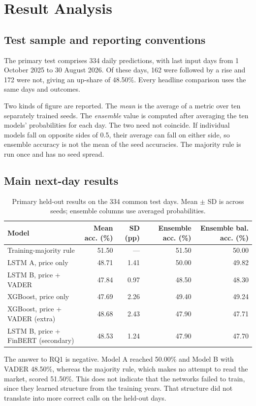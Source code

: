 \section{Result Analysis}
\label{ch:results}
\subsection{Test sample and reporting conventions}
The primary test comprises 334 daily predictions, with last input days from 1 October 2025 to 30 August 2026. Of these days, 162 were followed by a rise and 172 were not, giving an up-share of 48.50\%. Every headline comparison uses the same days and outcomes.

Two kinds of figure are reported. The \emph{mean} is the average of a metric over ten separately trained seeds. The \emph{ensemble} value is computed after averaging the ten models' probabilities for each day. The two need not coincide. If individual models fall on opposite sides of 0.5, their average can fall on either side, so ensemble accuracy is not the mean of the seed accuracies. The majority rule is run once and has no seed spread.

\subsection{Main next-day results}
\begin{table}[htbp]\centering\small
\caption{Primary held-out results on the 334 common test days. Mean $\pm$ SD is across seeds; ensemble columns use averaged probabilities.}\label{tab:mainresults}
\begin{tabularx}{\textwidth}{Xrrrr}
\toprule
Model & Mean acc. (\%) & SD (pp) & Ensemble acc. (\%) & Ensemble bal. acc. (\%)\\\midrule
Training-majority rule & 51.50 & --- & 51.50 & 50.00\\
LSTM A, price only & 48.71 & 1.41 & 50.00 & 49.82\\
LSTM B, price + VADER & 47.84 & 0.97 & 48.50 & 48.30\\
XGBoost, price only & 47.69 & 2.26 & 49.40 & 49.24\\
XGBoost, price + VADER (extra) & 48.68 & 2.43 & 47.90 & 47.71\\
LSTM B, price + FinBERT (secondary) & 48.53 & 1.24 & 47.90 & 47.70\\
\bottomrule
\end{tabularx}
\end{table}

The answer to RQ1 is negative. Model A reached 50.00\% and Model B with VADER 48.50\%, whereas the majority rule, which makes no attempt to read the market, scored 51.50\%. This does not indicate that the networks failed to train, since they learned structure from the training years. That structure did not translate into more correct calls on the held-out days.

